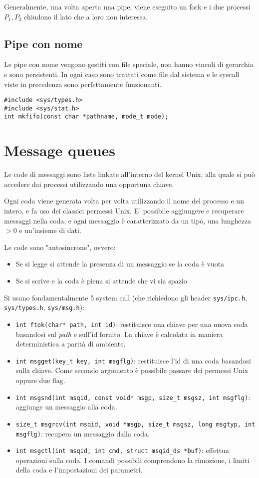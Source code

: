 \documentclass[11pt]{article}
\begin{document}
Generalmente, una volta aperta una pipe, viene eseguito un fork e i due processi $P_1, P_2$ chiudono il lato che a loro non interessa.

\subsection{Pipe con nome}

Le pipe con nome vengono gestiti con file speciale, non hanno vincoli di gerarchia e sono persistenti. In ogni caso sono trattati come file dal sistema e le syscall viste in precedenza sono perfettamente funzionanti.

\begin{verbatim}
#include <sys/types.h>
#include <sys/stat.h>
int mkfifo(const char *pathname, mode_t mode);
\end{verbatim}

\section{Message queues}

Le code di messaggi sono liste linkate all'interno del kernel Unix, alla quale si può accedere dai processi utilizzando una opportuna chiave.

Ogni coda viene generata volta per volta utilizzando il nome del processo e un intero, e fa uso dei classici permessi Unix. E' possibile aggiungere e recuperare messaggi nella coda, e ogni messaggio è caratterizzato da un tipo, una lunghezza $>0$ e un'insieme di dati.

Le code sono "autosincrone", ovvero:
\begin{itemize}
    \item Se si legge si attende la presenza di un messaggio se la coda è vuota
    \item Se si scrive e la coda è piena si attende che vi sia spazio
\end{itemize}

Si usano fondamentalmente 5 system call (che richiedono gli header \verb|sys/ipc.h|, \verb|sys/types.h|, \verb|sys/msg.h|):
\begin{itemize}
    \item \verb|int ftok(char* path, int id)|: restituisce una chiave per una nuova coda basandosi sul \textit{path} e sull'id fornito. La chiave è calcolata in maniera deterministica a parità di ambiente.
    \item \verb|int msgget(key_t key, int msgflg)|: restituisce l'id di una coda basandosi sulla chiave. Come secondo argomento è possibile passare dei permessi Unix oppure due flag.
    \item \verb|int msgsnd(int msqid, const void* msgp, size_t msgsz, int msgflg)|: aggiunge un messaggio alla coda.
    \item \verb|size_t msgrcv(int msqid, void *msgp, size_t msgsz, long msgtyp, int msgflg)|: recupera un messaggio dalla coda.
    \item \verb|int msgctl(int msqid, int cmd, struct msqid_ds *buf)|: effettua operazioni sulla coda. I comandi possibili comprendono la rimozione, i limiti della coda e l'impostazioni dei parametri.
\end{itemize}
\end{document}

